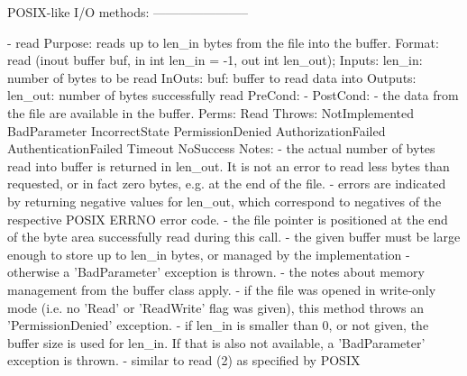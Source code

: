 \begin{myspec}
 
    POSIX-like I/O methods:
    -----------------------
 
    - read
      Purpose:  reads up to len_in bytes from the file into
                the buffer.
      Format:   read               (inout buffer      buf,
                                    in    int         len_in = -1,
                                    out   int         len_out);
      Inputs:   len_in:             number of bytes to be read
      InOuts:   buf:                buffer to read data into
      Outputs:  len_out:            number of bytes successfully 
                                    read
      PreCond:  -
      PostCond: - the data from the file are available in the
                  buffer.
      Perms:    Read
      Throws:   NotImplemented
                BadParameter
                IncorrectState
                PermissionDenied
                AuthorizationFailed
                AuthenticationFailed
                Timeout
                NoSuccess
      Notes:    - the actual number of bytes read into buffer
                  is returned in len_out.  It is not an error
                  to read less bytes than requested, or in fact
                  zero bytes, e.g. at the end of the file.
                - errors are indicated by returning negative
                  values for len_out, which correspond to
                  negatives of the respective POSIX ERRNO error
                  code.
                - the file pointer is positioned at the end of
                  the byte area successfully read during this 
                  call.
                - the given buffer must be large enough to
                  store up to len_in bytes, or managed by the
                  implementation - otherwise a 'BadParameter'
                  exception is thrown.
                - the notes about memory management from the
                  buffer class apply.
                - if the file was opened in write-only mode (i.e.
                  no 'Read' or 'ReadWrite' flag was given), this
                  method throws an 'PermissionDenied' exception.
                - if len_in is smaller than 0, or not given, 
                  the buffer size is used for len_in.
                  If that is also not available, a
                  'BadParameter' exception is thrown.
                - similar to read (2) as specified by POSIX
 

\end{myspec}
